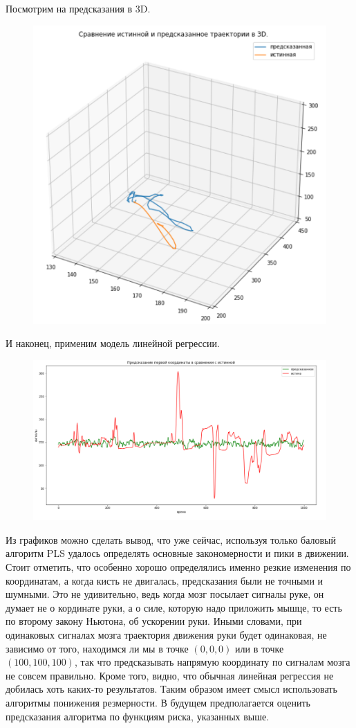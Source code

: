 \documentclass{article}
\begin{document}
Посмотрим на предсказания в 3D.
\begin{figure}[H]
\includegraphics[scale=0.5]{images/4.png}
\end{figure}
И наконец, применим модель линейной регрессии.
\begin{figure}[H]
\includegraphics[scale=0.5]{images/5.png}
\end{figure}

Из графиков можно сделать вывод, что уже сейчас, используя только баловый алгоритм PLS удалось определять основные закономерности и пики в движении. Стоит отметить, что особенно хорошо определялись именно резкие изменения по координатам, а когда кисть не двигалась, предсказания были не точными и шумными. Это не удивительно, ведь когда мозг посылает сигналы руке, он думает не о кординате руки, а о силе, которую надо приложить мышце, то есть по второму закону Ньютона, об ускорении руки. Иными словами, при одинаковых сигналах мозга траектория движения руки будет одинаковая, не зависимо от того, находимся ли мы в точке $(0,0,0)$ или в точке $(100,100,100)$, так что предсказывать напрямую координату по сигналам мозга не совсем правильно. Кроме того, видно, что обычная линейная регрессия не добилась хоть каких-то результатов. Таким образом имеет смысл использовать алгоритмы понижения резмерности. В будущем предполагается оценить предсказания алгоритма по функциям риска, указанных выше.
\end{document}
